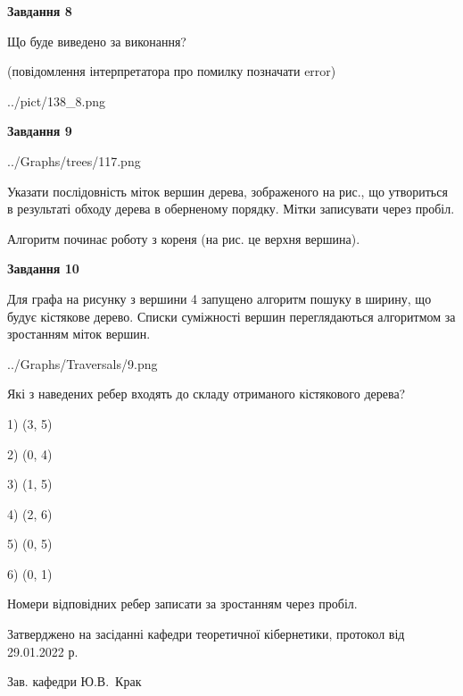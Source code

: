 \documentclass[12pt, ukrainian]{article}
\begin{document}
{\begin {large}
{\begin {center}\textbf{Завдання 8}\end {center}}\par
Що буде виведено за виконання?\par
 (повідомлення інтерпретатора про помилку позначати error)\par
\begin{center}
	{../pict/138_8.png}
\end{center}
\newpage

{\begin {center}\textbf{Завдання 9}\end {center}}\par

\begin{center}
	{../Graphs/trees/117.png}
\end{center}
Указати послідовність міток вершин дерева, зображеного на рис., що утвориться в результаті обходу дерева в оберненому порядку. Мітки записувати через пробіл.\par Алгоритм починає роботу з кореня (на рис. це верхня вершина).\par
\newpage

{\begin {center}\textbf{Завдання 10}\end {center}}\par
Для графа на рисунку з вершини 4 запущено алгоритм пошуку в ширину, що будує кістякове дерево. Списки суміжності вершин переглядаються алгоритмом за зростанням міток вершин.\par
\begin{center}
	{../Graphs/Traversals/9.png}
\end{center}
\par Які з наведених ребер входять до складу отриманого кістякового дерева?\par
1) (3, 5)\par
2) (0, 4)\par
3) (1, 5)\par
4) (2, 6)\par
5) (0, 5)\par
6) (0, 1)\par
{\vskip 15pt} Номери відповідних ребер записати за зростанням через пробіл.\par
\newpage


\end {large}
}
{\smallskip \begin {small} Затверджено на засіданні кафедри теоретичної кібернетики, протокол  від   29.01.2022 р.\par\smallskip\smallskip
{\parbox {6.5 cm}{Зав. кафедри \dotfill Ю.В.~Крак}} \end{small}}
\end{document}
